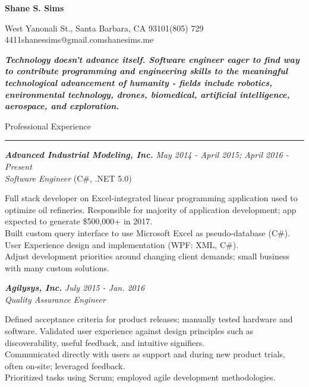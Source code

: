 \documentclass[10pt]{article}
\newcommand{\simsbullet}{{\raisebox{2pt}{\tiny $\bullet$}}\hspace{8pt}}
\newcommand{\midlinesimsbullet}{\hspace{4pt}{\raisebox{2pt}{\tiny $\bullet$}}\hspace{5pt}}
\begin{document}

{\centerline{\huge\bf\sffamily Shane S. Sims}}
\vskip 8pt
{\centerline{ West Yanonali St., Santa Barbara, CA 93101{\midlinesimsbullet}(805) 729 4411{\midlinesimsbullet}shanessims@gmail.com{\midlinesimsbullet}shanesims.me}}

\vskip 12pt

{\bf\it Technology doesn't advance itself. Software engineer eager to find way to contribute programming and engineering skills to the meaningful technological advancement of humanity - fields include robotics, environmental technology, drones, biomedical, artificial intelligence, aerospace, and exploration.}
\vskip 18pt

{\Large\sffamily Professional Experience}
\vskip 2pt
\hrule
\vskip 6pt

{\bfseries\itshape\sffamily Advanced Industrial Modeling, Inc.} \hfill \textsf{\textit{May 2014 - April 2015; April 2016 - Present}} \\
\textit{\textsf{Software Engineer}} (C\#, .NET 5.0)
\vskip 4pt

\setlength{\leftskip}{16pt}

Full stack developer on Excel-integrated linear programming application used to optimize oil refineries. 
\vskip 4pt
\simsbullet Responsible for majority of application development; app expected to generate \$500,000+ in 2017.\\
\simsbullet Built custom query interface to use Microsoft Excel as pseudo-database (C\#). \\
\simsbullet User Experience design and implementation (WPF: XML, C\#). \\
\simsbullet Adjust development priorities around changing client demands; small business with many custom solutions. 

\setlength{\leftskip}{0pt}

\vskip 12pt

{\bfseries\itshape\sffamily Agilysys, Inc.} \hfill \textsf{\textit{July 2015 - Jan. 2016}} \\
\textit{\textsf{Quality Assurance Engineer}}
\vskip 4pt

\setlength{\leftskip}{16pt}

Defined acceptance criteria for product releases; manually tested hardware and software.
\vskip 4pt
\simsbullet Validated user experience against design principles such as discoverability, useful feedback, and intuitive signifiers. \\
\simsbullet Communicated directly with users as support and during new product trials, often on-site; leveraged feedback. \\
\simsbullet Prioritized tasks using Scrum; employed agile development methodologies.
\end{document}

